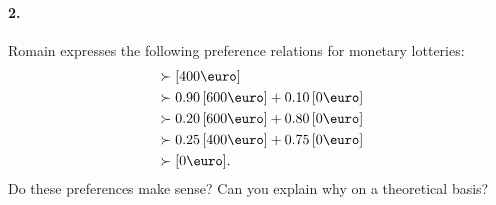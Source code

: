 \documentclass[a4paper,notitlepage,12pt]{article}
\begin{document}
\paragraph{2. } Romain expresses the following preference relations for monetary lotteries:
\begin{align*}
	[600\text{\euro}] & \succ [400\text{\euro}] \\
							 			& \succ 0.90 \, [600\text{\euro}] + 0.10 \, [0\text{\euro}] \\
							 			& \succ 0.20 \, [600\text{\euro}] + 0.80 \, [0\text{\euro}] \\
							 			& \succ 0.25 \, [400\text{\euro}] + 0.75 \, [0\text{\euro}] \\
							 			& \succ [0\text{\euro}].
\end{align*}
Do these preferences make sense? Can you explain why on a theoretical basis?
\end{document}
